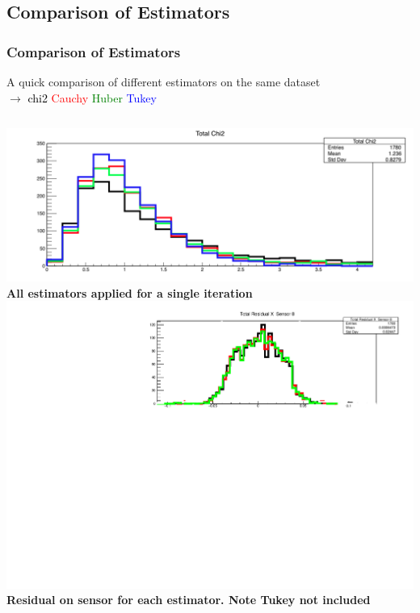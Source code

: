 \documentclass{beamer}
\begin{document}
\subsection{Comparison of Estimators}
\begin{frame}
\frametitle{Comparison of Estimators}
A quick comparison of different estimators on the same dataset \\ $\rightarrow$ \textcolor{black}{chi2}  \textcolor{red}{Cauchy} \textcolor{green}{Huber}  \textcolor{blue}{Tukey}
\begin{columns}[t]
\centering
\includegraphics[width=1.1\linewidth]{pics/chi2-est.png}\\
\tiny{\textbf{All estimators applied for a single iteration}}\\
\includegraphics[width=1.1\linewidth]{pics/estimators-sensor-8.pdf}\\
\tiny{\textbf{Residual on sensor for each estimator. Note Tukey not included}}\\
\centering

\end{columns}
\end{frame}
\end{document}

